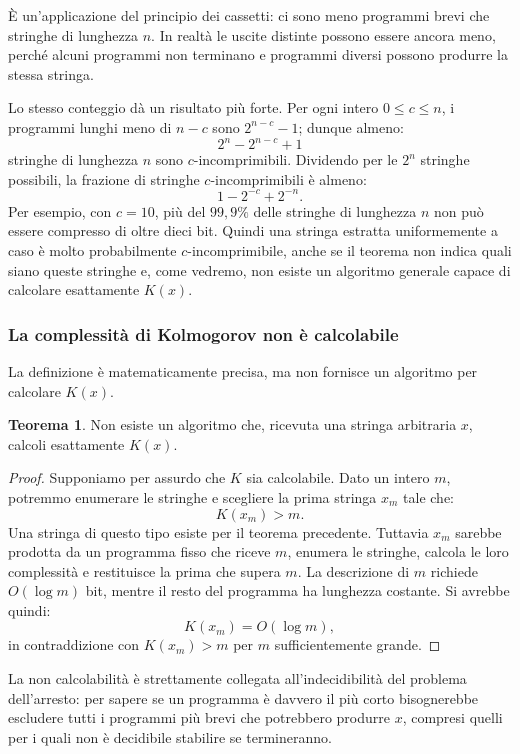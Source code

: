 \documentclass{article}
\theoremstyle{definition}
\newtheorem{theorem}{Teorema}[section] %
\numberwithin{equation}{section}
\begin{document}
È un'applicazione del principio dei cassetti: ci sono meno programmi brevi che
stringhe di lunghezza $n$. In realtà le uscite distinte possono essere ancora
meno, perché alcuni programmi non terminano e programmi diversi possono
produrre la stessa stringa.

Lo stesso conteggio dà un risultato più forte. Per ogni intero
$0\leq c\leq n$, i programmi lunghi meno di $n-c$ sono
$2^{n-c}-1$; dunque almeno:
\[
    2^n-2^{n-c}+1
\]
stringhe di lunghezza $n$ sono $c$-incomprimibili. Dividendo per le $2^n$
stringhe possibili, la frazione di stringhe $c$-incomprimibili è almeno:
\[
    1-2^{-c}+2^{-n}.
\]
Per esempio, con $c=10$, più del $99{,}9\%$ delle stringhe di lunghezza $n$
non può essere compresso di oltre dieci bit. Quindi una stringa estratta
uniformemente a caso è molto probabilmente $c$-incomprimibile, anche se il
teorema non indica quali siano queste stringhe e, come vedremo, non esiste un
algoritmo generale capace di calcolare esattamente $K(x)$.

\subsubsection{La complessità di Kolmogorov non è calcolabile}
La definizione è matematicamente precisa, ma non fornisce un algoritmo per
calcolare $K(x)$.

\begin{theorem}\label{theorem_kolmogorov_uncomputable}
    Non esiste un algoritmo che, ricevuta una stringa arbitraria $x$, calcoli
    esattamente $K(x)$.
\end{theorem}

\begin{proof}
    Supponiamo per assurdo che $K$ sia calcolabile. Dato un intero $m$,
    potremmo enumerare le stringhe e scegliere la prima stringa $x_m$ tale che:
    \[
        K(x_m)>m.
    \]
    Una stringa di questo tipo esiste per il teorema precedente. Tuttavia
    $x_m$ sarebbe prodotta da un programma fisso che riceve $m$, enumera le
    stringhe, calcola le loro complessità e restituisce la prima che supera
    $m$. La descrizione di $m$ richiede $O(\log m)$ bit, mentre il resto del
    programma ha lunghezza costante. Si avrebbe quindi:
    \[
        K(x_m)=O(\log m),
    \]
    in contraddizione con $K(x_m)>m$ per $m$ sufficientemente grande.
\end{proof}

La non calcolabilità è strettamente collegata all'indecidibilità del problema
dell'arresto: per sapere se un programma è davvero il più corto bisognerebbe
escludere tutti i programmi più brevi che potrebbero produrre $x$, compresi
quelli per i quali non è decidibile stabilire se termineranno.
\end{document}

